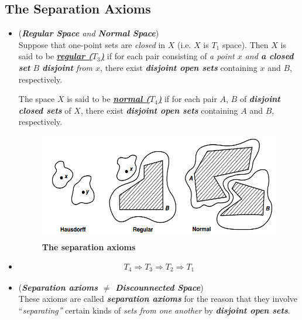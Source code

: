\documentclass[11pt]{article}
\begin{document}
\subsection{The Separation Axioms}
\begin{itemize}
\item \begin{definition} (\emph{\textbf{Regular Space} and \textbf{Normal Space}})\\
Suppose that one-point sets are \emph{closed} in $X$ (i.e. $X$ is $T_1$ space). Then $X$ is said to be \underline{\emph{\textbf{regular ($T_3$)}}} if for each pair consisting of \emph{a point $x$ and \textbf{a closed set} $B$ \textbf{disjoint} from $x$}, there exist \emph{\textbf{disjoint open sets}} containing $x$ and $B$, respectively. 

The space $X$ is said to be \underline{\emph{\textbf{normal ($T_4$)}}} if for each pair $A$, $B$ of \emph{\textbf{disjoint closed sets}} of $X$, there exist \emph{\textbf{disjoint open sets}} containing $A$ and $B$, respectively.
\end{definition}

\begin{figure}
\begin{minipage}[t]{1\linewidth}
  \centering
  \centerline{\includegraphics[scale = 0.5]{separation_axioms.png}}
\end{minipage}
\caption{\footnotesize{\textbf{The separation axioms \citep{munkres2000topology}}}}
\label{fig: separation_axioms}
\end{figure}

\item \begin{proposition}
\begin{align*}
T_4 \Rightarrow T_3 \Rightarrow T_2 \Rightarrow T_1
\end{align*}
\end{proposition}

\item \begin{remark} (\emph{\textbf{Separation axioms $\neq$ Discounnected Space}})\\
These axioms are called \emph{\textbf{separation axioms}} for the reason that they involve ``\emph{separating”} certain kinds of \emph{sets from one another} by \emph{\textbf{disjoint open sets}}. 


\end{remark}
\end{itemize}
\end{document}
